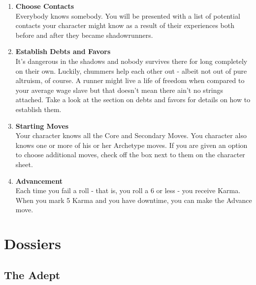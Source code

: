 \begin{enumerate}
    \item \textbf{Choose Contacts} \\
    Everybody knows somebody. You will be presented with a list of potential contacts your character might know as a result of their experiences both before and after they became shadowrunners.
    
    \item \textbf{Establish Debts and Favors} \\
    It's dangerous in the shadows and nobody survives there for long completely on their own. Luckily, chummers help each other out - albeit not out of pure altruism, of course. A runner might live a life of freedom when compared to your average wage slave but that doesn't mean there ain't no strings attached. Take a look at the section on \refname{debts and favors} for details on how to establish them.
    
    \item \textbf{Starting Moves} \\
    Your character knows all the Core and Secondary Moves. You character also knows one or more of his or her Archetype moves. If you are given an option to choose additional moves, check off the box next to them on the character sheet.
    
    \item \textbf{Advancement} \\
    Each time you fail a roll - that is, you roll a 6 or less - you receive Karma. When you mark 5 Karma and you have downtime, you can make the Advance move.
\end{enumerate}



\clearpage
\section{Dossiers} \label{Dossiers}
\subsection{The Adept}

